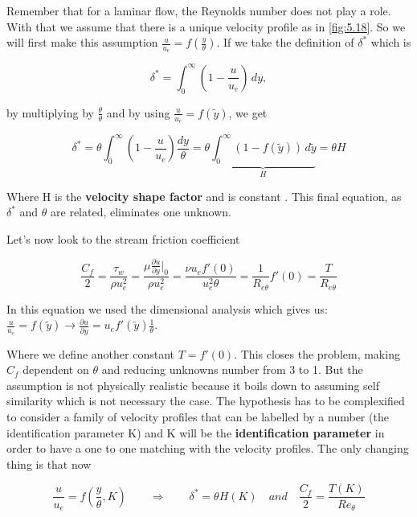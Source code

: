 Remember that for a laminar flow, the Reynolds number does not play a role. With that we assume that there is a unique velocity profile as in \autoref{fig:5.18}. So we will first make this assumption $\frac{u}{u_e} = f\left(\frac{y}{\theta}\right)$. If we take the definition of $\delta ^*$ which is

\begin{equation}
\delta^*=\int_0^\infty (1-\frac{u}{u_e}) \, dy,
\end{equation}

by multiplying by $\frac{\theta}{\theta}$ and by using $\frac{u}{u_e}=f(\tilde{y})$, we get

\begin{equation}
\delta^*=\theta \int_0^\infty (1-\frac{u}{u_e}) \frac{d y}{\theta}=\theta \underbrace{\int_0^\infty (1-f(\tilde{y})) \, d \tilde{y}}_{H} = \theta H
\end{equation}

Where H is the \textbf{velocity shape factor} and is constant . This final equation, as $\delta ^*$ and $\theta$ are related, eliminates one unknown.

Let's now look to the stream friction coefficient

\begin{equation}
\frac{C_f}{2}=\frac{\tau_w}{\rho u_e^2}=\frac{\mu \frac{\partial u}{\partial y}|_0}{\rho u_e^2}=\frac{\nu u_e f'(0)}{u_e^2 \theta}=\frac{1}{R_{e \theta}} f'(0)=\frac{T}{R_{e \theta}}
\end{equation}

In this equation we used the dimensional analysis which gives us:
$\frac{u}{u_e}=f(\tilde{y}) \rightarrow \frac{\partial u}{\partial y}=u_e f'(\tilde{y}) \frac{1}{\theta}$.

Where we define another constant $T=f'(0)$. This closes the problem, making $C_f$ dependent on $\theta$ and reducing unknowns number from 3 to 1. But the assumption is not physically realistic because it boils down to assuming self similarity which is not necessary the case. The hypothesis has to be complexified to consider a family of velocity profiles that can be labelled by a number (the identification parameter K) and K will be the \textbf{identification parameter} in order to have a one to one matching with the velocity profiles. The only changing thing is that now 

\begin{equation}
\frac{u}{u_e} = f(\frac{y}{\theta}, K) \qquad \Rightarrow \qquad \delta^*=\theta H(K) \quad and \quad \frac{C_f}{2} = \frac{T(K)}{Re_\theta}
\label{eq:5.86}
\end{equation}

